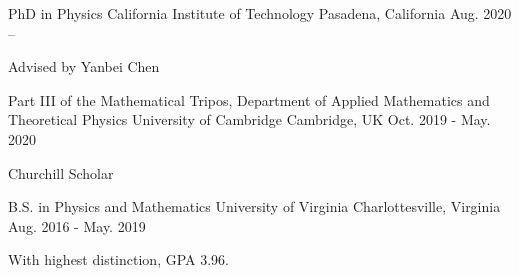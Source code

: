 


\begin{cventries}

  \cventry
    { PhD in Physics} %
    {California Institute of Technology} %
    {Pasadena, California} %
    {Aug. 2020 --} %
    {
      \begin{cvitems} %
        \item {Advised by Yanbei Chen \\}
      \end{cvitems}
    }
  \cventry
    { Part III of the Mathematical Tripos, Department of Applied Mathematics and Theoretical Physics} %
    {University of Cambridge} %
    {Cambridge, UK} %
    {Oct. 2019 - May. 2020} %
    {
      \begin{cvitems} %
        \item {Churchill Scholar\\}
      \end{cvitems}
    }
  \cventry
    {B.S. in Physics and Mathematics} %
    {University of Virginia} %
    {Charlottesville, Virginia} %
    {Aug. 2016 - May. 2019} %
    {
      \begin{cvitems} %
        \item {With highest distinction, GPA 3.96.}
      \end{cvitems}
    }

\end{cventries}
